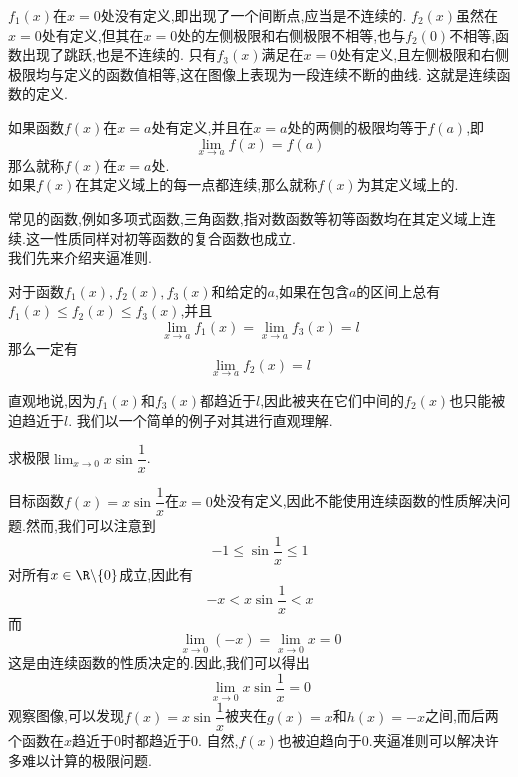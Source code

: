 \documentclass{ctexart}
\begin{document}
\indent $f_1(x)$在$x=0$处没有定义,即出现了一个间断点,应当是不连续的.%
$f_2(x)$虽然在$x=0$处有定义,但其在$x=0$处的左侧极限和右侧极限不相等,也与$f_2(0)$不相等,函数出现了跳跃,也是不连续的.%
只有$f_3(x)$满足在$x=0$处有定义,且左侧极限和右侧极限均与定义的函数值相等,这在图像上表现为一段连续不断的曲线.%
这就是连续函数的定义.
\begin{definition}[0A.1.2 连续与连续函数]
    如果函数$f(x)$在$x=a$处有定义,并且在$x=a$处的两侧的极限均等于$f(a)$,即
    \[\lim_{x\to a}f(x)=f(a)\]
    那么就称$f(x)$在$x=a$处.\\
    如果$f(x)$在其定义域上的每一点都连续,那么就称$f(x)$为其定义域上的.
\end{definition}
常见的函数,例如多项式函数,三角函数,指对数函数等初等函数均在其定义域上连续.这一性质同样对初等函数的复合函数也成立.\vspace{4pt}\\
\indent 我们先来介绍夹逼准则.
\begin{theorem}[0A.1.3 夹逼准则]
    对于函数$f_1(x),f_2(x),f_3(x)$和给定的$a$,如果在包含$a$的区间上总有$f_1(x)\leqslant f_2(x)\leqslant f_3(x)$,并且
    \[\lim_{x\to a}f_1(x)=\lim_{x\to a}f_3(x)=l\]
    那么一定有
    \[\lim_{x\to a}f_2(x)=l\]
    
\end{theorem}
直观地说,因为$f_1(x)$和$f_3(x)$都趋近于$l$,因此被夹在它们中间的$f_2(x)$也只能被迫趋近于$l$.%
我们以一个简单的例子对其进行直观理解.
\begin{problem}[P.0A.1]
    求极限$\displaystyle\lim_{x\to0}x\sin\dfrac1x$.
\end{problem}
\begin{solution}
    目标函数$f(x)=x\sin\dfrac1x$在$x=0$处没有定义,因此不能使用连续函数的性质解决问题.然而,我们可以注意到
    \[-1\leqslant \sin\dfrac1x\leqslant 1\]
    对所有$x\in\R\backslash\{0\}$成立,因此有
    \[-x<x\sin\dfrac1x<x\]
    而
    \[\lim_{x\to0}(-x)=\lim_{x\to0}x=0\]
    这是由连续函数的性质决定的.因此,我们可以得出
    \[\lim_{x\to0}x\sin\dfrac1x=0\]
    观察图像,可以发现$f(x)=x\sin\dfrac1x$被夹在$g(x)=x$和$h(x)=-x$之间,而后两个函数在$x$趋近于$0$时都趋近于$0$.%
    自然,$f(x)$也被迫趋向于$0$.夹逼准则可以解决许多难以计算的极限问题.
    \begin{tightcenter}
        
    \end{tightcenter}
    
\end{solution}
\end{document}
